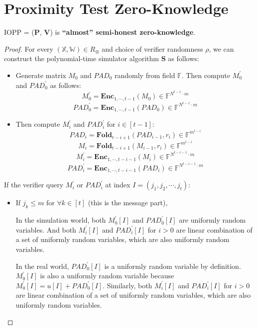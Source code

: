 \section{Proximity Test Zero-Knowledge}

\begin{lemma}
\label{lemma:szkpc-zk}

IOPP = ($\textbf{P}$, $\textbf{V}$) is \textbf{``almost'' semi-honest zero-knowledge}.

\end{lemma}
\begin{proof}

For every $(\mathbb{X}, \mathbb{W}) \in R_\otimes$ and choice of verifier randomness $\rho$, we can construct the polynomial-time simulator algorithm $\textbf{S}$ as follows:


\begin{itemize}
    \item Generate matrix $M_0$ and $PAD_0$ randomly from field $\mathbb{F}$. Then compute $M_0^\prime$ and $PAD_0^\prime$ as follows:
    $$
        M_0^{\prime} = \textbf{Enc}_{1,\cdots,t-1}(M_0) \in \mathbb{F}^{N^{t-1} \cdot m}
    $$
    $$
        PAD_0^{\prime} = \textbf{Enc}_{1,\cdots,t-1}(PAD_0) \in \mathbb{F}^{N^{t-1} \cdot m}
    $$
    \item Then compute $M_i^{\prime}$ and $PAD_i^\prime$ for $i \in [t-1]$:
    $$
        PAD_i = \textbf{Fold}_{t-i+1}(PAD_{i-1}, r_i) \in \mathbb{F}^{m^{t-i}}
    $$
    $$
        M_i = \textbf{Fold}_{t-i+1}(M_{i-1}, r_i) \in \mathbb{F}^{m^{t-i}}
    $$
    $$
        M_i^\prime =  \textbf{Enc}_{1, \cdots, t- i - 1}(M_i) \in \mathbb{F}^{N^{t-i-1} \cdot m}
    $$
    $$
        PAD_i^\prime =  \textbf{Enc}_{1, \cdots, t- i - 1}(PAD_i) \in \mathbb{F}^{N^{t-i-1} \cdot m}
    $$
\end{itemize}

If the verifier query $M_i^{\prime}$ or $PAD_i^\prime$ at index $I = (j_1, j_2, \cdots, j_t)$:

\begin{itemize}
    \item If $j_k \le m$ for $\forall k \in [t]$ (this is the message part),
    
    In the simulation world, both $M_0^\prime[I]$ and $PAD_0^\prime[I]$ are uniformly random variables. And both $M_i^\prime[I]$ and $PAD_i^\prime[I]$ for $i > 0$ are linear combination of a set of uniformly random variables, which are also uniformly random variables.
    
    In the real world, $PAD_0^\prime[I]$ is a uniformly random variable by definition. $M_0^\prime[I]$ is also a uniformly random variable because $M_0^\prime[I] = u[I] + PAD_0^\prime[I]$. Similarly, both $M_i^\prime[I]$ and $PAD_i^\prime[I]$ for $i > 0$ are linear combination of a set of uniformly random variables, which are also uniformly random variables.
    

\end{itemize}
\end{proof}
